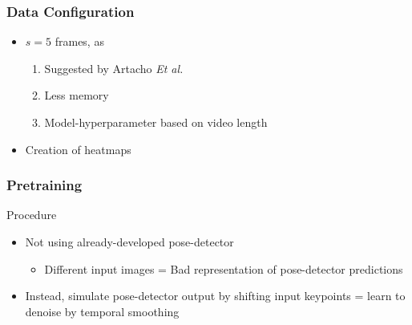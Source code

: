 \documentclass{beamer}
\begin{document}
\begin{frame}
    \frametitle{Data Configuration}
    \begin{itemize}
        \item<1-> $s = 5$ frames, as 
        \begin{enumerate}
            \item<1-> Suggested by Artacho \textit{Et al.}
            \item<1-> Less memory
            \item<1-> Model-hyperparameter based on video length
        \end{enumerate}
        \item<2-> Creation of heatmaps
    \end{itemize}

    
\end{frame}

\begin{frame}
    \frametitle{Pretraining}
    Procedure
    \begin{itemize}
        \item<1-> Not using already-developed pose-detector
        \begin{itemize}
            \item Different input images = Bad representation of pose-detector predictions
        \end{itemize}
        \item<2-> Instead, simulate pose-detector output by shifting input keypoints = learn to denoise by temporal smoothing
    \end{itemize}
\end{frame}
\end{document}
